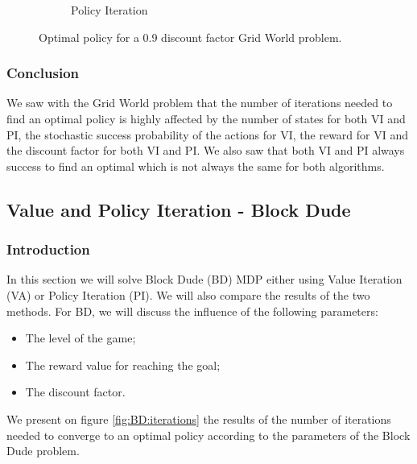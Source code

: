 \documentclass[10pt, twocolumn]{article}
\begin{document}
\begin{figure}[]
\begin{subfigure}[t]{0.24\textwidth}
						\caption{Policy Iteration}
						\label{fig:GW:discount:PI}
					\end{subfigure}
					\caption{Optimal policy for a 0.9 discount factor Grid World problem.}
					\label{fig:GW:discount:comparison}
				\end{figure}
			\subsubsection*{Conclusion}
				We saw with the Grid World problem that the number of iterations needed to find an optimal policy is highly affected by the number of states for both VI and PI, the stochastic success probability of the actions for VI, the reward for VI and the discount factor for both VI and PI. We also saw that both VI and PI always success to find an optimal which is not always the same for both algorithms.
		\subsection{Value and Policy Iteration - Block Dude}
			\subsubsection*{Introduction}
				In this section we will solve Block Dude (BD) MDP either using Value Iteration (VA) or Policy Iteration (PI). We will also compare the results of the two methods. For BD, we will discuss the influence of the following parameters:
				\begin{itemize}
					\item The level of the game;
					\item The reward value for reaching the goal;
					\item The discount factor.
				\end{itemize}
				We present on figure \ref{fig:BD:iterations} the results of the number of iterations needed to converge to an optimal policy according to the parameters of the Block Dude problem.
\end{document}
